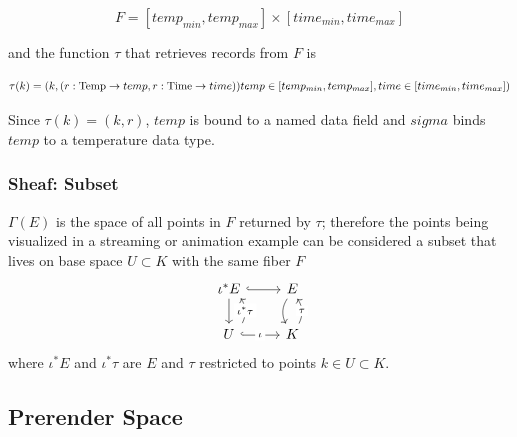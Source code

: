 \documentclass[../main.tex]{subfiles}
\begin{document}
\begin{equation}
F = [temp_{min}, temp_{max}] \times [time_{min}, time_{max}]
\end{equation}

and the function $\tau$ that retrieves records from $F$ is

\begin{equation}
\tau(k) =(k, (r: \textrm{Temp}\rightarrow temp, r: \textrm{Time}\rightarrow time))\\
temp \in [temp_{min}, temp_{max}], time \in [time_{min}, time_{max}])
\end{equation}

Since $\tau(k)=(k, r)$, $temp$ is bound to a named data field and $sigma$ binds $temp$ to a temperature data type. 

\subsubsection{Sheaf: Subset}

$\Gamma(E)$ is the space of all points in $F$ returned by $\tau$; therefore the points being visualized in a streaming or animation example can be considered a subset that lives on base space $U \subset K$ with the same fiber $F$
\begin{equation}
    \begin{tikzcd}
        \iota^\ast E \arrow[r, hook] \arrow[d]                                                                       & E \arrow[d, bend right]                       \\
        U \arrow[r, "\iota" description, hook] \arrow[u, "\iota^\ast \tau" description, bend right, shift right=2] & K \arrow[u, "\tau" description, bend right]
    \end{tikzcd}    
\end{equation}
where $\iota^*E$ and $\iota^*\tau$ are $E$ and $\tau$ restricted to points $k \in U \subset K$.   


\subsection{Prerender Space}
\label{sec:display}

\end{document}
